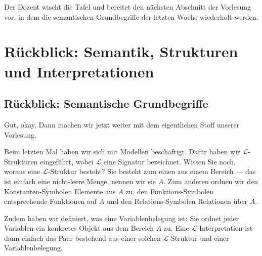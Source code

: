 \begin{ai-global-state-checkpoint-invisible-content}
\end{ai-global-state-checkpoint-invisible-content}

\begin{lecture-break}
Der Dozent wischt die Tafel und bereitet den nächsten Abschnitt der Vorlesung vor, in dem die semantischen Grundbegriffe der letzten Woche wiederholt werden.
\end{lecture-break}

\section{Rückblick: Semantik, Strukturen und Interpretationen}

\subsection{Rückblick: Semantische Grundbegriffe}
\begin{spoken-clean}[00:06:48 - 00:07:47]
Gut, okay. Dann machen wir jetzt weiter mit dem eigentlichen Stoff unserer Vorlesung.

Beim letzten Mal haben wir sich mit Modellen beschäftigt. Dafür haben wir $\mathcal{L}$-Strukturen eingeführt, wobei $\mathcal{L}$ eine Signatur bezeichnet. Wissen Sie noch, woraus eine $\mathcal{L}$-Struktur besteht? Sie besteht zum einen aus einem Bereich --- das ist einfach eine nicht-leere Menge, nennen wir sie $A$. Zum anderen ordnen wir den Konstanten-Symbolen Elemente aus $A$ zu, den Funktions-Symbolen entsprechende Funktionen auf $A$ und den Relations-Symbolen Relationen über $A$.

Zudem haben wir definiert, was eine Variablenbelegung ist: Sie ordnet jeder Variablen ein konkretes Objekt aus dem Bereich $A$ zu. Eine $\mathcal{L}$-Interpretation ist dann einfach das Paar bestehend aus einer solchen $\mathcal{L}$-Struktur und einer Variablenbelegung.
\end{spoken-clean}


